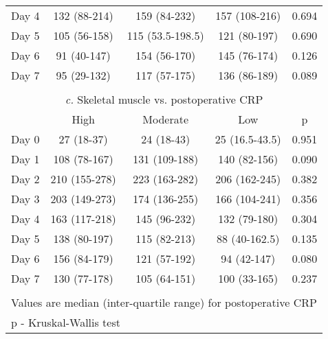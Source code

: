\begin{table}[p]
\begin{tabular}{|l c c c c |}
		Day 4 & 132 (88-214)  & 159 (84-232)     & 157 (108-216)  & 0.694                  \\
		Day 5 & 105 (56-158)  & 115 (53.5-198.5) & 121 (80-197)   & 0.690                  \\
		Day 6 & 91 (40-147)   & 154 (56-170)     & 145 (76-174)   & 0.126                  \\
		Day 7 & 95 (29-132)   & 117 (57-175)     & 136 (86-189)   & 0.089                  \\ \hline
		                               \multicolumn{5}{c}{}                                \\
		      \multicolumn{5}{c}{\textit{c.} Skeletal muscle vs. postoperative CRP}        \\ \hline
		      & High          & Moderate         & Low            & p                      \\
		Day 0 & 27 (18-37)    & 24 (18-43)       & 25 (16.5-43.5) & 0.951                  \\
		Day 1 & 108 (78-167)  & 131 (109-188)    & 140 (82-156)   & 0.090                  \\
		Day 2 & 210 (155-278) & 223 (163-282)    & 206 (162-245)  & 0.382                  \\
		Day 3 & 203 (149-273) & 174 (136-255)    & 166 (104-241)  & 0.356                  \\
		Day 4 & 163 (117-218) & 145 (96-232)     & 132 (79-180)   & 0.304                  \\
		Day 5 & 138 (80-197)  & 115 (82-213)     & 88 (40-162.5)  & 0.135                  \\
		Day 6 & 156 (84-179)  & 121 (57-192)     & 94 (42-147)    & 0.080                  \\
		Day 7 & 130 (77-178)  & 105 (64-151)     & 100 (33-165)   & 0.237                  \\ \hline
		                               \multicolumn{5}{c}{}                                \\
		\multicolumn{5}{l}{Values are median (inter-quartile range) for postoperative CRP} \\
		\multicolumn{5}{l}{p - Kruskal-Wallis test}
	\end{tabular}	
\end{table}



